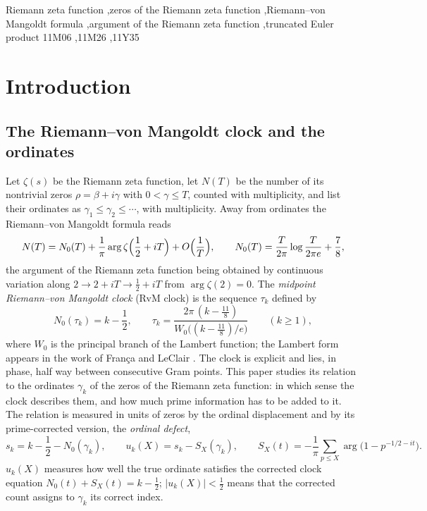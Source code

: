 \documentclass[preprint,12pt]{elsarticle}
\numberwithin{equation}{section}
\theoremstyle{plain}
\theoremstyle{definition}
\theoremstyle{remark}
\newcommand{\NO}{N_0}
\begin{document}
\begin{frontmatter}
\begin{abstract}
\end{abstract}

\begin{keyword}
Riemann zeta function \sep zeros of the Riemann zeta function \sep Riemann--von Mangoldt formula \sep argument of the Riemann zeta function \sep truncated Euler product
\MSC[2020] 11M06 \sep 11M26 \sep 11Y35
\end{keyword}
\end{frontmatter}

\tableofcontents

\section{Introduction}
\label{sec:introduction}

\subsection{The Riemann--von Mangoldt clock and the ordinates}
\label{subsec:clock_intro}
Let $\zeta(s)$ be the Riemann zeta function, let $N(T)$ be the number of its nontrivial zeros $\rho=\beta+i\gamma$ with $0<\gamma\le T$, counted with multiplicity, and list their ordinates as $\gamma_1\le\gamma_2\le\cdots$, with multiplicity. Away from ordinates the Riemann--von Mangoldt formula reads \cite[\S\S9.3--9.4]{Titchmarsh1986}
\begin{equation}
 N(T)=\NO(T)+\frac1\pi\arg\zeta\Bigl(\frac12+iT\Bigr)+O\Bigl(\frac1T\Bigr),\qquad \NO(T)=\frac{T}{2\pi}\log\frac{T}{2\pi e}+\frac78,
 \label{eq:intro_rvm}
\end{equation}
the argument of the Riemann zeta function being obtained by continuous variation along $2\to2+iT\to\frac12+iT$ from $\arg\zeta(2)=0$. The \emph{midpoint Riemann--von Mangoldt clock} (RvM clock) is the sequence $\tau_k$ defined by
\begin{equation}
 \NO(\tau_k)=k-\frac12,\qquad \tau_k=\frac{2\pi\,(k-\frac{11}8)}{W_0\bigl((k-\frac{11}8)/e\bigr)}\qquad(k\ge1),
 \label{eq:intro_clock}
\end{equation}
where $W_0$ is the principal branch of the Lambert function; the Lambert form appears in the work of Fran\c{c}a and LeClair \cite{FrancaLeClair2014,FrancaLeClair2015}. The clock is explicit and lies, in phase, half way between consecutive Gram points. This paper studies its relation to the ordinates $\gamma_k$ of the zeros of the Riemann zeta function: in which sense the clock describes them, and how much prime information has to be added to it. The relation is measured in units of zeros by the ordinal displacement and by its prime-corrected version, the \emph{ordinal defect},
\begin{equation}
 s_k=k-\frac12-\NO(\gamma_k),\qquad u_k(X)=s_k-S_X(\gamma_k),\qquad S_X(t)=-\frac1\pi\sum_{p\le X}\arg\bigl(1-p^{-1/2-it}\bigr).
 \label{eq:intro_defect}
\end{equation}
$u_k(X)$ measures how well the true ordinate satisfies the corrected clock equation $\NO(t)+S_X(t)=k-\frac12$; $|u_k(X)|<\frac12$ means that the corrected count assigns to $\gamma_k$ its correct index.
\end{document}
